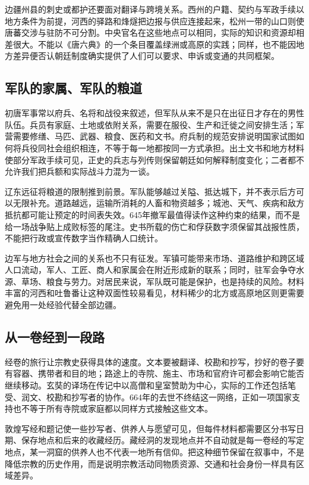 边疆州县的刺史或都护还要面对翻译与跨境关系。西州的户籍、契约与军政手续以地方条件为前提，河西的驿路和烽燧把边报与供应连接起来，松州一带的山口则使唐蕃交涉与驻防不可分割。中央官名在这些地点可以相同，实际的知识和资源却相差很大。不能以《唐六典》的一个条目覆盖绿洲或高原的实践；同样，也不能因地方差异便否认朝廷制度确实提供了人们可以要求、申诉或变通的共同框架。

\subsection{军队的家属、军队的粮道}
初唐军事常以府兵、名将和战役来叙述，但军队从来不是只在出征日才存在的男性队伍。兵员有家庭、土地或依附关系，需要在服役、生产和迁徙之间安排生活；军营需要修缮、马匹、武器、粮食、医药和文书。府兵制的规范安排说明国家试图如何将兵役同社会组织相连，不等于每一地都按同一方式承担。出土文书和地方材料使部分军政手续可见，正史的兵志与列传则保留朝廷如何解释制度变化；二者都不允许我们把兵额和实际战斗力混为一谈。

辽东远征将粮道的限制推到前景。军队能够越过关隘、抵达城下，并不表示后方可以无限补充。道路越远，运输所消耗的人畜和物资越多；城池、天气、疾病和敌方抵抗都可能让预定的时间表失效。645年撤军最值得读作这种约束的结果，而不是给一场战争贴上成败标签的尾注。史书所载的伤亡和俘获数字须保留其战报性质，不能把行政或宣传数字当作精确人口统计。

边军与地方社会之间的关系也不只有征发。军镇可能带来市场、道路维护和跨区域人口流动，军人、工匠、商人和家属会在附近形成新的联系；同时，驻军会争夺水源、草场、粮食与劳力。对居民来说，军队既可能是保护，也是持续的风险。材料丰富的河西和吐鲁番让这种双面性较易看见，材料稀少的北方或高原地区则更需要避免用一处经验代替全部边疆。

\subsection{从一卷经到一段路}
经卷的旅行让宗教史获得具体的速度。文本要被翻译、校勘和抄写，抄好的卷子要有容器、携带者和目的地；路途上的寺院、施主、市场和官府许可都会影响它能否继续移动。玄奘的译场在传记中以高僧和皇室赞助为中心，实际的工作还包括笔受、润文、校勘和抄写者的协作。664年的去世不终结这一网络，正如一项国家支持也不等于所有寺院或家庭都以同样方式接触这些文本。

敦煌写经和题记使一些抄写者、供养人与愿望可见，但每件材料都需要区分书写日期、保存地点和后来的收藏经历。藏经洞的发现地点并不自动就是每一卷经的写定地点，某一洞窟的供养人也不代表一地所有信仰。把这种细节保留在叙事中，不是降低宗教的历史作用，而是说明宗教活动同物质资源、交通和社会身份一样具有区域差异。

